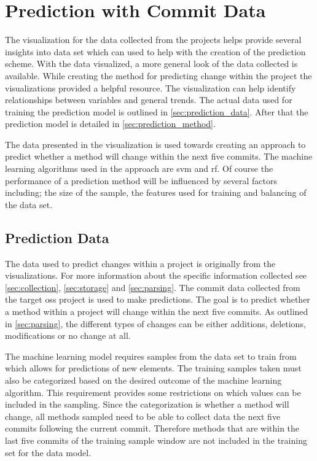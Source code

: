 \chapter{Prediction with Commit Data}
\label{chap:prediction}


The visualization for the data collected from the projects helps provide several insights into data set which can used to help with the creation of the prediction scheme. With the data visualized, a more general look of the data collected is available. While creating the method for predicting change within the project the visualizations provided a helpful resource. The visualization can help identify relationships between variables and general trends. The actual data used for training the prediction model is outlined in \autoref{sec:prediction_data}. After that the prediction model is detailed in \autoref{sec:prediction_method}. %

The data presented in the visualization is used towards creating an approach to predict whether a method will change within the next five commits. The machine learning algorithms used in the approach are \gls{svm} and \gls{rf}. Of course the performance of a prediction method will be influenced by several factors including; the size of the sample, the features used for training and balancing of the data set.

\section{Prediction Data}
\label{sec:prediction_data}

The data used to predict changes within a project is originally from the visualizations. For more information about the specific information collected see \autoref{sec:collection}, \autoref{sec:storage} and \autoref{sec:parsing}. The commit data collected from the target \gls{oss} project is used to make predictions. The goal is to predict whether a method within a project will change within the next five commits. As outlined in \autoref{sec:parsing}, the different types of changes can be either additions, deletions, modifications or no change at all.

The machine learning model requires samples from the data set to train from which allows for predictions of new elements. The training samples taken must also be categorized based on the desired outcome of the machine learning algorithm. This requirement provides some restrictions on which values can be included in the sampling. Since the categorization is whether a method will change, all methods sampled need to be able to collect data the next five commits following the current commit. Therefore methods that are within the last five commits of the training sample window are not included in the training set for the data model.

